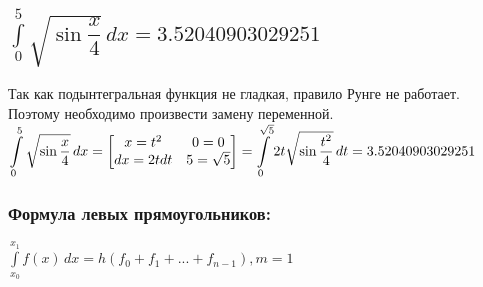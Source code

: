 \documentclass[12pt,a4paper]{article}
\begin{document}
\subsection{$\displaystyle\int\limits_0^5 \sqrt{\sin\dfrac{x}{4}}\,dx=3.52040903029251$}
Так как подынтегральная функция не гладкая, правило Рунге не работает. Поэтому необходимо произвести замену переменной.\\ 

$\displaystyle\int\limits_0^5 \sqrt{\sin\dfrac{x}{4}}\,dx=\begin{bmatrix}x=t^2&0=0\\dx=2tdt&5=\sqrt{5}\end{bmatrix}=\int\limits_0^{\sqrt{5}} 2t\sqrt{\sin\dfrac{t^2}{4}}\,dt=3.52040903029251\\$

\subsubsection*{Формула левых прямоугольников:}
$\displaystyle \int \limits_{x_0}^{x_1} f(x)\,dx = h(f_0+f_1+...+f_{n-1}),m=1$
\end{document}

